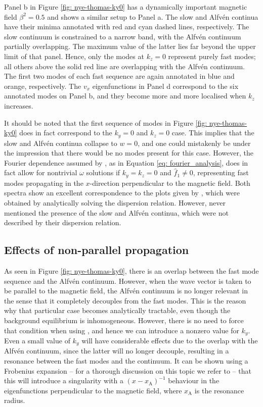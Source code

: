 Panel b in Figure \ref{fig: nye-thomas-ky0} has a dynamically important magnetic field $\beta^2 = 0.5$ and shows a similar setup to Panel a. The slow and Alfv\'en continua have their minima annotated with red and cyan dashed lines, respectively. The slow continuum is constrained to a narrow band, with the Alfv\'en continuum partially overlapping. The maximum value of the latter lies far beyond the upper limit of that panel. Hence, only the modes at $k_z = 0$ represent purely fast modes; all others above the solid red line are overlapping with the Alfv\'en continuum. The first two modes of each fast sequence are again annotated in blue and orange, respectively. The $v_x$ eigenfunctions in Panel d correspond to the six annotated modes on Panel b, and they become more and more localised when $k_z$ increases.

It should be noted that the first sequence of modes in Figure \ref{fig: nye-thomas-ky0} does in fact correspond to the $k_y = 0$ and $k_z = 0$ case. This implies that the slow and Alfv\'en continua collapse to $w = 0$, and one could mistakenly be under the impression that there would be no modes present for this case. However, the Fourier dependence assumed by {\legolas}, as in Equation \eqref{eq: fourier_analysis}, does in fact allow for nontrivial $\omega$ solutions if $k_y = k_z = 0$ and $\hat{f}_1 \neq 0$, representing fast modes propagating in the $x$-direction perpendicular to the magnetic field.
Both spectra show an excellent correspondence to the plots given by \citet{nye1976}, which were obtained by analytically solving the dispersion relation. However, \citet{nye1976} never mentioned the presence of the slow and Alfv\'en continua, which were not described by their dispersion relation.


\subsection{Effects of non-parallel propagation} \label{ss: non_parallel_propagation}
As seen in Figure \ref{fig: nye-thomas-ky0}, there is an overlap between the fast mode sequence and the Alfv\'en continuum. However, when the wave vector is taken to be parallel to the magnetic field, the Alfv\'en continuum is no longer relevant in the sense that it completely decouples from the fast modes. This is the reason why that particular case becomes analytically tractable, even though the background equilibrium is inhomogeneous. However, there is no need to force that condition when using {\legolas}, and hence we can introduce a nonzero value for $k_y$. Even a small value of $k_y$ will have considerable effects due to the overlap with the Alfv\'en continuum, since the latter will no longer decouple, resulting in a resonance between the fast modes and the continuum.
It can be shown using a Frobenius expansion -- for a thorough discussion on this topic we refer to \citet{book_MHD} -- that this will introduce a singularity with a $\left(x - x_\text{A}\right)^{-1}$ behaviour in the eigenfunctions perpendicular to the magnetic field, where $x_\text{A}$ is the resonance radius.


